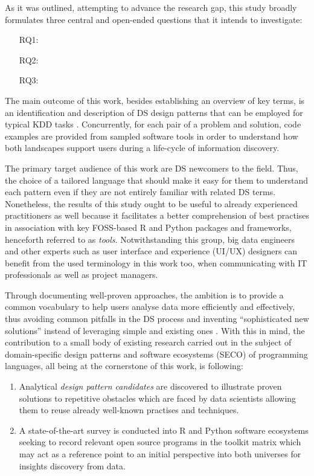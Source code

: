 As it was outlined, attempting to advance the research gap, this study broadly formulates three central and open-ended questions that it intends to investigate:
%
\begin{enumerate}
\item [RQ1:] \ObjectivesQOne
\item [RQ2:] \ObjectivesQTwo
\item [RQ3:] \ObjectivesQThree
\end{enumerate}
%
The main outcome of this work, besides establishing an overview of key terms, is an identification and description of \ac{DS} design patterns that can be employed for typical \ac{KDD} tasks \parencite{GoebelMichGru1999}.
Concurrently, for each pair of a problem and solution, code examples are provided from sampled software tools in order to understand how both landscapes support users during a life-cycle of information discovery.

The primary target audience of this work are \ac{DS} newcomers to the field. 
Thus, the choice of a tailored language that should make it easy for them to understand each pattern even if they are not entirely familiar with related \ac{DS} terms.
Nonetheless, the results of this study ought to be useful to already experienced practitioners as well because it facilitates a better comprehension of best practises in association with key \ac{FOSS}-based R and Python packages and frameworks, henceforth referred to as \emph{tools}. 
Notwithstanding this group, big data engineers and other experts such as user interface and experience (\ac{UI/UX}) designers can benefit from the used terminology in this work too, when communicating with \ac{IT} professionals as well as project managers.

Through documenting well-proven approaches, the ambition is to provide a common vocabulary to help users analyse data more efficiently and effectively, thus avoiding common pitfalls in the \ac{DS} process and inventing \enquote{sophisticated new solutions} instead of leveraging simple and existing ones \parencite{Lara2015BigData}.
With this in mind, the contribution to a small body of existing research carried out in the subject of domain-specific design patterns and software ecosystems (\ac{SECO}) of programming languages, all being at the cornerstone of this work, is following:
%
\begin{enumerate}
  \item Analytical \emph{design pattern candidates} are discovered to illustrate proven solutions to repetitive obstacles which are faced by data scientists allowing them to reuse already well-known practises and techniques.
  \item A state-of-the-art survey is conducted into R and Python software ecosystems seeking to record relevant open source programs in the toolkit matrix which may act as a reference point to an initial perspective into both universes for insights discovery from data.
\end{enumerate}
%

